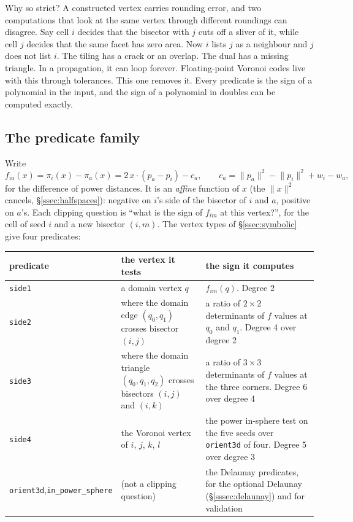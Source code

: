 \documentclass[11pt,a4paper]{article}
\newcommand{\code}[1]{\texttt{#1}}          %
\newcommand{\norm}[1]{\lVert #1\rVert}
\newcommand{\secref}[1]{\S\ref{#1}}
\begin{document}
Why so strict? A constructed vertex carries rounding error, and two computations that look at the
same vertex through different roundings can disagree. Say cell $i$ decides that the bisector
with $j$ cuts off a sliver of it, while cell $j$ decides that the same facet has zero area. Now
$i$ lists $j$ as a neighbour and $j$ does not list $i$. The tiling has a crack or an overlap. The
dual has a missing triangle. In a propagation, it can loop forever. Floating-point Voronoi codes
live with this through tolerances. This one removes it. Every predicate is the sign of a
polynomial in the input, and the sign of a polynomial in doubles can be computed exactly.

\subsection{The predicate family}\label{ssec:family}

Write
\[
  f_{ia}(x) = \pi_i(x) - \pi_a(x) = 2\,x\cdot(p_a - p_i) - c_a,
  \qquad c_a = \norm{p_a}^2 - \norm{p_i}^2 + w_i - w_a ,
\]
for the difference of power distances. It is an \emph{affine} function of $x$ (the $\norm{x}^2$
cancels, \secref{ssec:halfspaces}): negative on $i$'s side of the bisector of $i$ and $a$,
positive on $a$'s. Each clipping question is ``what is the sign of $f_{im}$ at this vertex?'',
for the cell of seed $i$ and a new bisector $(i, m)$. The vertex types of
\secref{ssec:symbolic} give four predicates:

{\small
\begin{xltabular}{\linewidth}{@{}P{2.9cm} L L@{}}
\toprule
predicate & the vertex it tests & the sign it computes \\
\midrule
\endhead
\code{side1} & a domain vertex $q$ & $f_{im}(q)$. Degree 2 \\
\code{side2} & where the domain edge $(q_0, q_1)$ crosses bisector $(i, j)$
  & a ratio of $2\times 2$ determinants of $f$ values at $q_0$ and $q_1$. Degree 4 over
    degree 2 \\
\code{side3} & where the domain triangle $(q_0, q_1, q_2)$ crosses bisectors $(i,j)$ and $(i,k)$
  & a ratio of $3\times 3$ determinants of $f$ values at the three corners. Degree 6 over
    degree 4 \\
\code{side4} & the Voronoi vertex of $i$, $j$, $k$, $l$
  & the power in-sphere test on the five seeds over \code{orient3d} of four. Degree 5 over
    degree 3 \\
\code{orient3d},\newline \code{in\_power\_sphere} & (not a clipping question)
  & the Delaunay predicates, for the optional Delaunay (\secref{sssec:delaunay}) and for
    validation \\
\bottomrule
\end{xltabular}}
\end{document}
